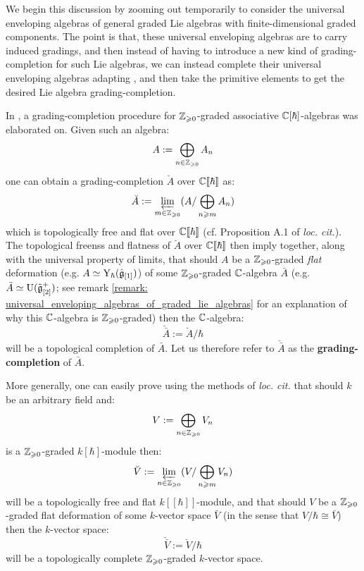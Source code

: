         We begin this discussion by zooming out temporarily to consider the universal enveloping algebras of general graded Lie algebras with finite-dimensional graded components. The point is that, these universal enveloping algebras are to carry induced gradings, and then instead of having to introduce a new kind of grading-completion for such Lie algebras, we can instead complete their universal enveloping algebras adapting \cite[Appendix A]{wendlandt_formal_shift_operators_on_yangian_doubles}, and then take the primitive elements to get the desired Lie algebra grading-completion.
        \begin{remark} \label{remark: grading_completions_of_positively_graded_algebras}
            In \cite[Appendix A]{wendlandt_formal_shift_operators_on_yangian_doubles}, a grading-completion procedure for $\mathbb{Z}_{\geqslant 0}$-graded associative $\mathbb{C}[\hbar]$-algebras was elaborated on. Given such an algebra:
                $$A := \bigoplus_{n \in \mathbb{Z}_{\geqslant 0}} A_n$$
            one can obtain a grading-completion $\breve{A}$ over $\mathbb{C}[\![\hbar]\!]$ as:
                $$\breve{A} := \varprojlim_{m \in \mathbb{Z}_{\geqslant 0}} ( A / \bigoplus_{n \geqslant m} A_n )$$
            which is topologically free and flat over $\mathbb{C}[\![\hbar]\!]$ (cf. Proposition A.1 of \textit{loc. cit.}). The topological freenss and flatness of $\breve{A}$ over $\mathbb{C}[\![\hbar]\!]$ then imply together, along with the universal property of limits, that should $A$ be a $\mathbb{Z}_{\geqslant 0}$-graded \textit{flat} deformation (e.g. $A \simeq \mathrm{Y}_{\hbar}(\hat{\mathfrak{g}}_{[1]})$) of some $\mathbb{Z}_{\geqslant 0}$-graded $\mathbb{C}$-algebra $\bar{A}$ (e.g. $\bar{A} \simeq \mathrm{U}(\tilde{\mathfrak{g}}_{[2]}^+)$; see remark \ref{remark: universal_enveloping_algebras_of_graded_lie_algebras} for an explanation of why this $\mathbb{C}$-algebra is $\mathbb{Z}_{\geqslant 0}$-graded) then the $\mathbb{C}$-algebra:
                $$\breve{\bar{A}} := \breve{A}/\hbar$$
            will be a topological completion of $\bar{A}$. Let us therefore refer to $\breve{\bar{A}}$ as the \textbf{grading-completion} of $\bar{A}$. 

            More generally, one  can easily prove using the methods of \textit{loc. cit.} that should $k$ be an arbitrary field and:
                $$V := \bigoplus_{n \in \mathbb{Z}_{\geqslant 0}} V_n$$
            is a $\mathbb{Z}_{\geqslant 0}$-graded $k[\hbar]$-module then:
                $$\breve{V} := \varprojlim_{n \in \mathbb{Z}_{\geqslant 0}} ( V / \bigoplus_{n \geqslant m} V_n )$$
            will be a topologically free and flat $k[\![\hbar]\!]$-module, and that should $V$ be a $\mathbb{Z}_{\geqslant 0}$-graded flat deformation of some $k$-vector space $\bar{V}$ (in the sense that $V/\hbar \cong \bar{V}$) then the $k$-vector space:
                $$\breve{\bar{V}} := \breve{V}/\hbar$$
            will be a topologically complete $\mathbb{Z}_{\geqslant 0}$-graded $k$-vector space. 
        \end{remark}

